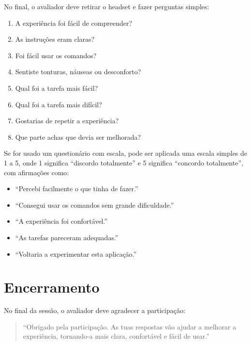 \documentclass[12pt,a4paper,oneside]{report}
\newcommand{\blankpage}{
    \clearpage
    \thispagestyle{empty}
    \null
    \clearpage
}
\begin{document}
No final, o avaliador deve retirar o headset e fazer perguntas simples:

\begin{enumerate}
    \item A experiência foi fácil de compreender?
    \item As instruções eram claras?
    \item Foi fácil usar os comandos?
    \item Sentiste tonturas, náuseas ou desconforto?
    \item Qual foi a tarefa mais fácil?
    \item Qual foi a tarefa mais difícil?
    \item Gostarias de repetir a experiência?
    \item Que parte achas que devia ser melhorada?
\end{enumerate}

Se for usado um questionário com escala, pode ser aplicada uma escala simples de 1 a 5, onde 1 significa ``discordo totalmente'' e 5 significa ``concordo totalmente'', com afirmações como:

\begin{itemize}
    \item ``Percebi facilmente o que tinha de fazer.''
    \item ``Consegui usar os comandos sem grande dificuldade.''
    \item ``A experiência foi confortável.''
    \item ``As tarefas pareceram adequadas.''
    \item ``Voltaria a experimentar esta aplicação.''
\end{itemize}

\section{Encerramento}

No final da sessão, o avaliador deve agradecer a participação:

\begin{quote}
    ``Obrigado pela participação. As tuas respostas vão ajudar a melhorar a experiência, tornando-a mais clara, confortável e fácil de usar.''
\end{quote}

\blankpage
\end{document}
